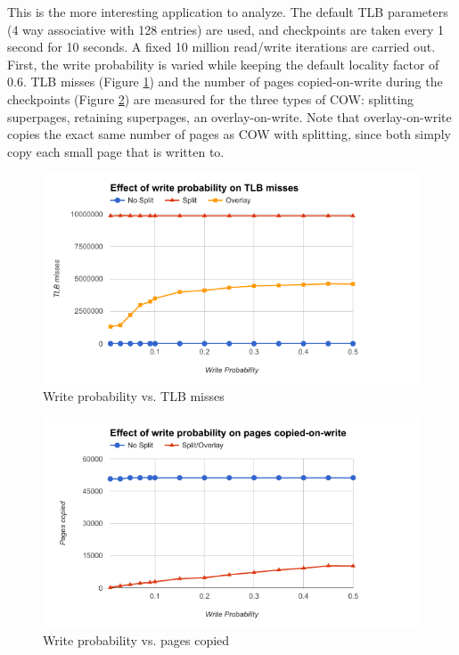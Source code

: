 This is the more interesting application to analyze. The default TLB parameters (4 way associative with 128 entries) are used, and checkpoints are taken every 1 second for 10 seconds. A fixed 10 million read/write iterations are carried out. First, the write probability is varied while keeping the default locality factor of $0.6$. TLB misses (Figure \ref{fig:write_prob_misses}) and the number of pages copied-on-write during the checkpoints (Figure \ref{fig:write_prob_copied}) are measured for the three types of COW: splitting superpages, retaining superpages, an overlay-on-write. Note that overlay-on-write copies the exact same number of pages as COW with splitting, since both simply copy each small page that is written to.
\begin{figure}
    \centering
    \includegraphics[width=6in]{Figures/write_prob_tlb}
    \caption{Write probability vs. TLB misses}
    \label{fig:write_prob_misses}
\end{figure}
\begin{figure}
    \centering
    \includegraphics[width=6in]{Figures/write_prob_copied}
    \caption{Write probability vs. pages copied}
    \label{fig:write_prob_copied}
\end{figure}

